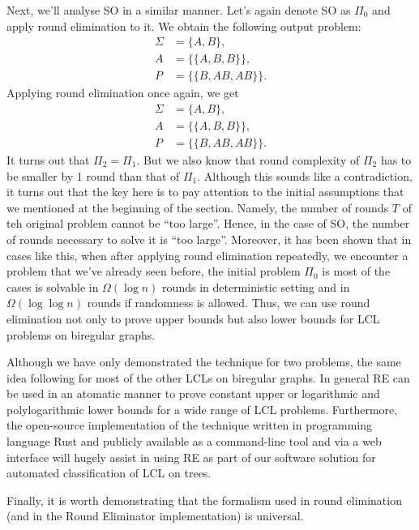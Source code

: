 Next, we'll analyse SO in a similar manner. Let's again denote SO as $\Pi_0$ and apply
round elimination to it. We obtain the following output problem:
\begin{align*}
\Sigma &= \{A, B\}, \\
A &= \{ \{A, B, B\} \}, \\
P &= \{ \{B, AB, AB\}\}.
\end{align*}
Applying round elimination once again, we get
\begin{align*}
\Sigma &= \{A, B\}, \\
A &= \{ \{A, B, B\} \}, \\
P &= \{ \{B, AB, AB\}\}.
\end{align*}
It turns out that $\Pi_2 = \Pi_1$. But we also know that round complexity of $\Pi_2$
has to be smaller by 1 round than that of $\Pi_1$. Although this sounds like a contradiction,
it turns out that the key here is to pay attention to the initial assumptions that we mentioned at the
beginning of the section. Namely, the number of rounds $T$ of teh original problem cannot be ``too large''.
Hence, in the case of SO, the number of rounds necessary to solve it is ``too large''. Moreover,
it has been shown that in cases like this, when after applying round elimination repeatedly,
we encounter a problem that we've already seen before, the initial problem $\Pi_0$ is most of the cases
is solvable in $\Omega(\log n)$ rounds in deterministic setting and in $\Omega(\log \log n)$ rounds
if randomness is allowed. Thus, we can use round elimination not only to prove upper bounds but
also lower bounds for LCL problems on biregular graphs.

Although we have only demonstrated the technique for two problems, the same idea following for most of the
other LCLs on biregular graphs. In general RE can be used in an atomatic manner to prove constant upper or
logarithmic and polylogarithmic lower bounds for a wide range of LCL problems. Furthermore, the open-source
implementation
of the technique written in programming language Rust and publicly available as a command-line tool and via
a web interface will hugely assist in using RE as part of our software solution for automated classification
of LCL on trees.

Finally, it is worth demonstrating that the formalism used in round
elimination (and in the Round Eliminator implementation) is universal.

